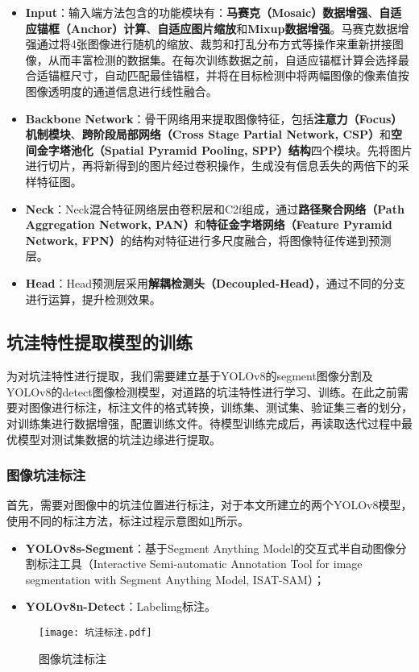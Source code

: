 \documentclass{MathorCupmodeling}
\begin{document}
	\begin{itemize}
		\item \textbf{Input}：输入端方法包含的功能模块有：\textbf{马赛克（Mosaic）数据增强}、\textbf{自适应锚框（Anchor）计算}、\textbf{自适应图片缩放}和\textbf{Mixup数据增强}\textcolor{blue}{\cite{YOLO数据增强}}。马赛克数据增强通过将4张图像进行随机的缩放、裁剪和打乱分布方式等操作来重新拼接图像，从而丰富检测的数据集。在每次训练数据之前，自适应锚框计算会选择最合适锚框尺寸，自动匹配最佳锚框，并将在目标检测中将两幅图像的像素值按图像透明度的通道信息进行线性融合。
		\item \textbf{Backbone Network}：骨干网络用来提取图像特征，包括\textbf{注意力（Focus）机制模块}、\textbf{跨阶段局部网络（Cross Stage Partial Network, CSP）}和\textbf{空间金字塔池化（Spatial Pyramid Pooling, SPP）结构}四个模块。先将图片进行切片，再将新得到的图片经过卷积操作，生成没有信息丢失的两倍下的采样特征图。
		\item \textbf{Neck}：Neck混合特征网络层由卷积层和C2f组成，通过\textbf{路径聚合网络（Path Aggregation Network, PAN）}和\textbf{特征金字塔网络（Feature Pyramid Network, FPN）}的结构对特征进行多尺度融合，将图像特征传递到预测层。
		\item \textbf{Head}：Head预测层采用\textbf{解耦检测头（Decoupled-Head）}\textcolor{blue}{\cite{Head}}，通过不同的分支进行运算，提升检测效果。
	\end{itemize}

	\subsection{坑洼特性提取模型的训练}
	为对坑洼特性进行提取，我们需要建立基于YOLOv8的segment图像分割及YOLOv8的detect图像检测模型，对道路的坑洼特性进行学习、训练。在此之前需要对图像进行标注，标注文件的格式转换，训练集、测试集、验证集三者的划分，对训练集进行数据增强，配置训练文件。待模型训练完成后，再读取迭代过程中最优模型对测试集数据的坑洼边缘进行提取。
	\subsubsection{图像坑洼标注}
	首先，需要对图像中的坑洼位置进行标注，对于本文所建立的两个YOLOv8模型，使用不同的标注方法，标注过程示意图如\textcolor{blue}{\cref{fig:图像坑洼标注}}所示。
	\begin{itemize}
		\item \textbf{YOLOv8s-Segment}：基于Segment Anything Model的交互式半自动图像分割标注工具（Interactive Semi-automatic Annotation Tool for image segmentation with Segment Anything Model, ISAT-SAM）；
		\item \textbf{YOLOv8n-Detect}：Labelimg标注。
	\end{itemize}
	\begin{figure}[H]
		\centering
		\texttt{[image: 坑洼标注.pdf]}
		\caption{图像坑洼标注}
		\label{fig:图像坑洼标注}
	\end{figure}
\end{document}
